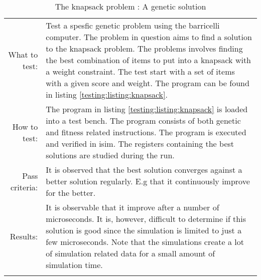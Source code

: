 \begin{table}[H]
  \begin{tabular}{r | p{8cm}}
    \noalign{\smallskip}\hline\noalign{\smallskip}
    
    What to test:  & Test a spesfic genetic problem using the barricelli computer. 
                     The problem in question aims to find a solution to the knapsack problem. 
                     The problems involves finding the best combination of items to put into a
                     knapsack with a weight constraint. The test start with a set of items with
                     a given score and weight. The program can be found in listing \ref{testing:listing:knapsack}.
                      \\

    \noalign{\smallskip}\hline\noalign{\smallskip}

    How to test:  & The program in listing \ref{testing:listing:knapsack} is loaded into a test bench. 
                    The program consists of both genetic and fitness related instructions.
                    The program is executed and verified in isim. The registers containing the
                    best solutions are studied during the run. \\

    \noalign{\smallskip}\hline\noalign{\smallskip}

    Pass criteria: &  It is observed that the best solution converges against a better solution
                       regularly. E.g that it continuously improve for the better.  \\
    
     \noalign{\smallskip}\hline\noalign{\smallskip}

    Results: &   It is observable that it improve after a number of microseconds. It is, however, 
                 difficult to determine if this solution is good since the simulation 
                 is limited to just a few microseconds. Note that the simulations
                 create a lot of simulation related data for a small amount of simulation time.  \\
   \noalign{\smallskip}\hline\noalign{\smallskip}
  
  
  \end{tabular}
  \caption{The knapsack problem : A genetic solution}
  \label{testing:fitness:pipeline_test}
\end{table}

